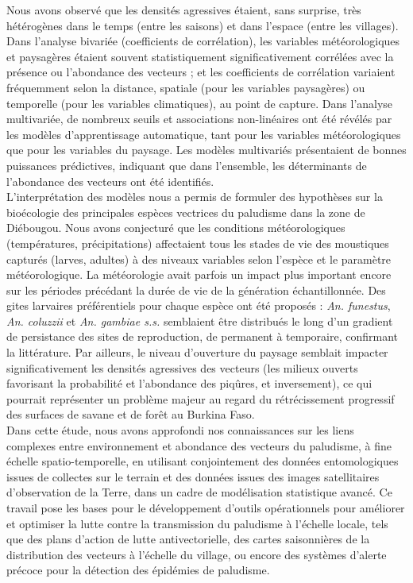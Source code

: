 \documentclass[12pt,twoside]{reedthesis}
\begin{document}
Nous avons observé que les densités agressives étaient, sans surprise, très hétérogènes dans le temps (entre les saisons) et dans l'espace (entre les villages). Dans l'analyse bivariée (coefficients de corrélation), les variables météorologiques et paysagères étaient souvent statistiquement significativement corrélées avec la présence ou l'abondance des vecteurs ; et les coefficients de corrélation variaient fréquemment selon la distance, spatiale (pour les variables paysagères) ou temporelle (pour les variables climatiques), au point de capture. Dans l'analyse multivariée, de nombreux seuils et associations non-linéaires ont été révélés par les modèles d'apprentissage automatique, tant pour les variables météorologiques que pour les variables du paysage. Les modèles multivariés présentaient de bonnes puissances prédictives, indiquant que dans l'ensemble, les déterminants de l'abondance des vecteurs ont été identifiés.\\

L'interprétation des modèles nous a permis de formuler des hypothèses sur la bioécologie des principales espèces vectrices du paludisme dans la zone de Diébougou. Nous avons conjecturé que les conditions météorologiques (températures, précipitations) affectaient tous les stades de vie des moustiques capturés (larves, adultes) à des niveaux variables selon l'espèce et le paramètre météorologique. La météorologie avait parfois un impact plus important encore sur les périodes précédant la durée de vie de la génération échantillonnée. Des gites larvaires préférentiels pour chaque espèce ont été proposés : \emph{An. funestus}, \emph{An. coluzzii} et \emph{An. gambiae s.s.} semblaient être distribués le long d'un gradient de persistance des sites de reproduction, de permanent à temporaire, confirmant la littérature. Par ailleurs, le niveau d'ouverture du paysage semblait impacter significativement les densités agressives des vecteurs (les milieux ouverts favorisant la probabilité et l'abondance des piqûres, et inversement), ce qui pourrait représenter un problème majeur au regard du rétrécissement progressif des surfaces de savane et de forêt au Burkina Faso.\\

Dans cette étude, nous avons approfondi nos connaissances sur les liens complexes entre environnement et abondance des vecteurs du paludisme, à fine échelle spatio-temporelle, en utilisant conjointement des données entomologiques issues de collectes sur le terrain et des données issues des images satellitaires d'observation de la Terre, dans un cadre de modélisation statistique avancé. Ce travail pose les bases pour le développement d'outils opérationnels pour améliorer et optimiser la lutte contre la transmission du paludisme à l'échelle locale, tels que des plans d'action de lutte antivectorielle, des cartes saisonnières de la distribution des vecteurs à l'échelle du village, ou encore des systèmes d'alerte précoce pour la détection des épidémies de paludisme.
\end{document}

